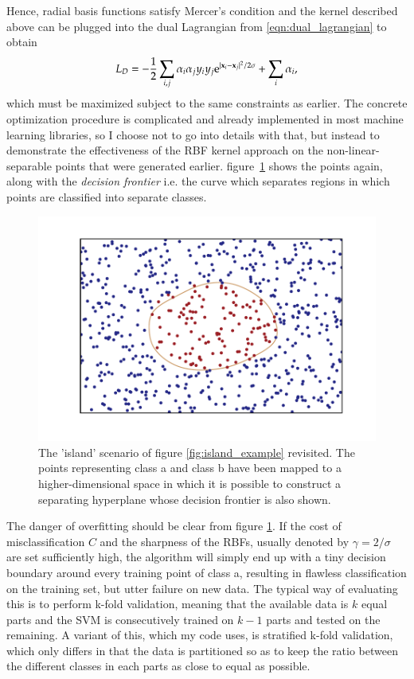 Hence, radial basis functions satisfy Mercer's condition and the kernel described above can be plugged into the dual Lagrangian from \eqref{eqn:dual_lagrangian} to obtain
\begin{equation}
	L_D = -\frac{1}{2} \sum_{i,j} \alpha_i \alpha_j y_i y_j \mathrm{e}^{|\mathbf{x}_i-\mathbf{x}_j|^2/2\sigma} + \sum_i \alpha_i,
\end{equation}
which must be maximized subject to the same constraints as earlier. The concrete optimization procedure is complicated and already implemented in most machine learning libraries, so I choose not to go into details with that, but instead to demonstrate the effectiveness of the RBF kernel approach on the non-linear-separable points that were generated earlier. figure~\ref{fig:kernel_trick_example} shows the points again, along with the \textit{decision frontier} i.e. the curve which separates regions in which points are classified into separate classes.
\begin{figure}
	\centering
	\includegraphics[width = \figwidth]{pics/ml/kernel_example.pdf}
	\caption{The 'island' scenario of figure \ref{fig:island_example} revisited. The points representing {\color{moerkeroed} class a} and {\color{oldhat}class b} have been mapped to a higher-dimensional space in which it is possible to construct a separating hyperplane whose {\color{nude} decision frontier} is also shown.}
	\label{fig:kernel_trick_example}
\end{figure}
The danger of overfitting should be clear from figure \ref{fig:kernel_trick_example}. If the cost of misclassification $C$ and the sharpness of the RBFs, usually denoted by $\gamma=2/\sigma$ are set sufficiently high, the algorithm will simply end up with a tiny decision boundary around every training point of class a, resulting in flawless classification on the training set, but utter failure on new data.
The typical way of evaluating this is to perform k-fold validation, meaning that the available data is $k$ equal parts and the SVM is consecutively trained on $k-1$ parts and tested on the remaining. A variant of this, which my code uses, is stratified k-fold validation, which only differs in that the data is partitioned so as to keep the ratio between the different classes in each parts as close to equal as possible.

